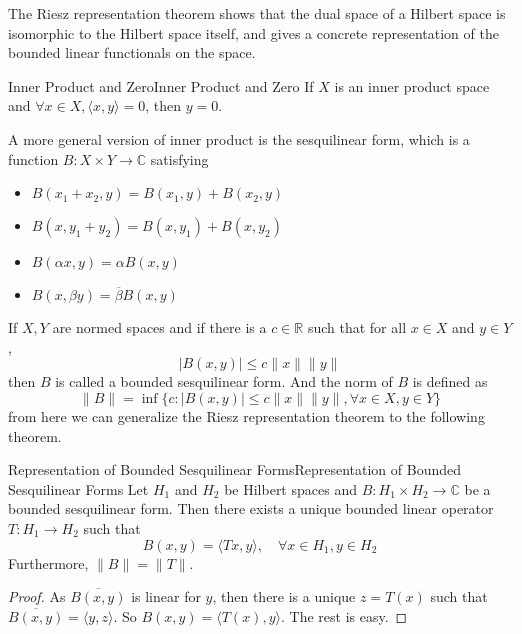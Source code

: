 \documentclass[../main.tex]{subfiles}
\begin{document}
\begin{remark}
	The Riesz representation theorem shows that the dual space of a Hilbert space is isomorphic to the Hilbert space itself, and gives a concrete representation of the bounded linear functionals on the space.
\end{remark}

\begin{lemma}{Inner Product and Zero}{Inner Product and Zero}
	If $X$ is an inner product space and $\forall x\in X, \langle x, y \rangle = 0$, then $y=0$.
\end{lemma}

A more general version of inner product is the sesquilinear form, which is a function $B: X \times Y \to \mathbb{C}$ satisfying
\begin{itemize}
	\item $B(x_1 + x_2, y) = B(x_1, y) + B(x_2, y)$
	\item $B(x, y_1 + y_2) = B(x, y_1) + B(x, y_2)$
	\item $B(\alpha x, y) = \alpha B(x, y)$
	\item $B(x, \beta y) = \overline{\beta} B(x, y)$
\end{itemize}
If $X,Y$ are normed spaces and if there is a $c\in \mathbb{R}$ such that for all $x\in X$ and $y\in Y$,
\begin{equation*}
	|B(x,y)| \leq c \|x\| \|y\|
\end{equation*}
then $B$ is called a bounded sesquilinear form. And the norm of $B$ is defined as
\begin{equation*}
	\|B\| = \inf \{c: |B(x,y)| \leq c \|x\| \|y\|, \forall x\in X, y\in Y\}
\end{equation*}
from here we can generalize the Riesz representation theorem to the following theorem.
\begin{theorem}{Representation of Bounded Sesquilinear Forms}{Representation of Bounded Sesquilinear Forms}
	Let $H_1$ and $H_2$ be Hilbert spaces and $B: H_1 \times H_2 \to \mathbb{C}$ be a bounded sesquilinear form. Then there exists a unique bounded linear operator $T: H_1 \to H_2$ such that
	\begin{equation}
		B(x,y) = \langle Tx, y \rangle, \quad \forall x\in H_1, y\in H_2
	\end{equation}
	Furthermore, $\|B\| = \|T\|$.
\end{theorem}
\begin{proof}
	As $\overline{B(x,y)}$ is linear for $y$, then there is a unique $z=T(x)$ such that $\overline{B(x,y)} = \langle y, z \rangle$. So $B(x,y) = \langle T(x), y \rangle$. The rest is easy.
\end{proof}
\end{document}
